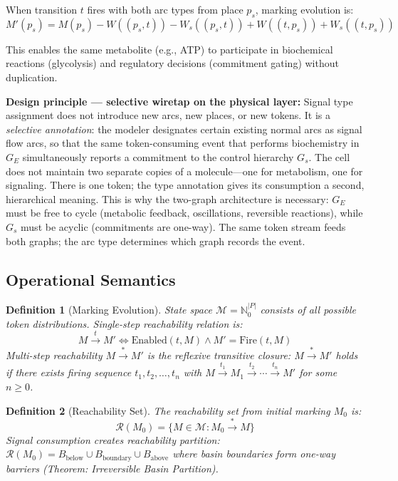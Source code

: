 \documentclass[10pt,letterpaper]{article}
\newtheorem{definition}{Definition}
\begin{document}
When transition $t$ fires with both arc types from place $p_s$, marking evolution is:
\begin{equation}
M'(p_s) = M(p_s) - W((p_s,t)) - W_s((p_s,t)) + W((t,p_s)) + W_s((t,p_s))
\end{equation}

This enables the same metabolite (e.g., ATP) to participate in biochemical reactions (glycolysis) and regulatory decisions (commitment gating) without duplication.

\textbf{Design principle --- selective wiretap on the physical layer:} Signal type assignment does not introduce new arcs, new places, or new tokens. It is a \textit{selective annotation}: the modeler designates certain existing normal arcs as signal flow arcs, so that the same token-consuming event that performs biochemistry in $G_E$ simultaneously reports a commitment to the control hierarchy $G_s$. The cell does not maintain two separate copies of a molecule---one for metabolism, one for signaling. There is one token; the type annotation gives its consumption a second, hierarchical meaning. This is why the two-graph architecture is necessary: $G_E$ must be free to cycle (metabolic feedback, oscillations, reversible reactions), while $G_s$ must be acyclic (commitments are one-way). The same token stream feeds both graphs; the arc type determines which graph records the event.

\subsection{Operational Semantics}

\begin{definition}[Marking Evolution]
State space $\mathcal{M} = \mathbb{N}_0^{|P|}$ consists of all possible token distributions. Single-step reachability relation is:
\begin{equation}
M \xrightarrow{t} M' \iff \text{Enabled}(t, M) \wedge M' = \text{Fire}(t, M)
\end{equation}
Multi-step reachability $M \xrightarrow{*} M'$ is the reflexive transitive closure: $M \xrightarrow{*} M'$ holds if there exists firing sequence $t_1, t_2, \ldots, t_n$ with $M \xrightarrow{t_1} M_1 \xrightarrow{t_2} \cdots \xrightarrow{t_n} M'$ for some $n \geq 0$.
\end{definition}

\begin{definition}[Reachability Set]
The reachability set from initial marking $M_0$ is:
\begin{equation}
\mathcal{R}(M_0) = \{M \in \mathcal{M} : M_0 \xrightarrow{*} M\}
\end{equation}
Signal consumption creates reachability partition: $\mathcal{R}(M_0) = B_{\text{below}} \cup B_{\text{boundary}} \cup B_{\text{above}}$ where basin boundaries form one-way barriers (Theorem: Irreversible Basin Partition).
\end{definition}
\end{document}
